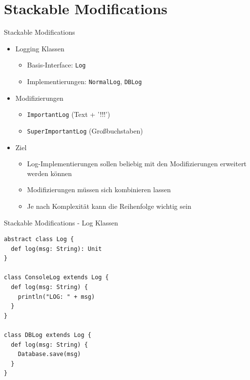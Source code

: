 \documentclass{beamer}
\begin{document}
\section{Stackable Modifications}

\begin{frame}[fragile]{Stackable Modifications}
\begin{itemize}
	\item Logging Klassen
		\begin{itemize}
			\item Basis-Interface: \verb!Log!
			\item Implementierungen: \verb!NormalLog!, \verb!DBLog!
		\end{itemize}
		\pause
	\item Modifizierungen
		\begin{itemize}
			\item \verb!ImportantLog! (Text + '!!!')
			\item \verb!SuperImportantLog! (Großbuchstaben)
		\end{itemize}
		\pause
	\item Ziel
		\begin{itemize}
			\item Log-Implementierungen sollen beliebig mit den Modifizierungen erweitert werden können
			\item Modifizierungen müssen sich kombinieren lassen
			\item Je nach Komplexität kann die Reihenfolge wichtig sein
		\end{itemize}
\end{itemize}
\end{frame}


\begin{frame}[fragile]{Stackable Modifications - Log Klassen}
\begin{lstlisting}
abstract class Log {
  def log(msg: String): Unit
}

class ConsoleLog extends Log {
  def log(msg: String) {
    println("LOG: " + msg)
  }
}

class DBLog extends Log {
  def log(msg: String) {
    Database.save(msg)
  }
}
\end{lstlisting}
\end{frame}

\end{document}
